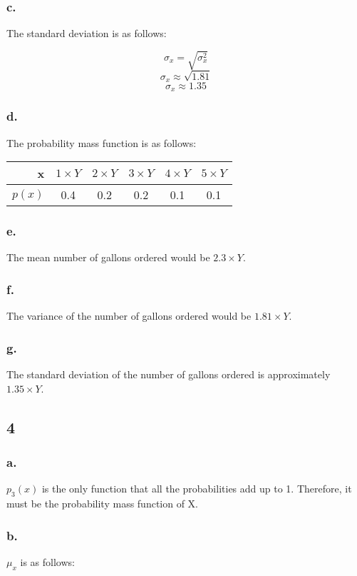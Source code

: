 \documentclass[11pt]{article}
\begin{document}
\subsubsection*{c.}
The standard deviation is as follows:

\[ \sigma_x = \sqrt{\sigma^2_x} \]
\[ \sigma_x \approx \sqrt{1.81} \]
\[ \sigma_x \approx 1.35 \]

\subsubsection*{d.}
The probability mass function is as follows:

\begin{tabular}{r|ccccc} %
    x & $1 \times Y$ & $2 \times Y$ & $3 \times Y$ & $4 \times Y$ & $5 \times Y$ \\
    \hline %
    $p(x)$ & 0.4 & 0.2 & 0.2 & 0.1 & 0.1
\end{tabular}

\subsubsection*{e.}
The mean number of gallons ordered would be $2.3 \times Y$. 

\subsubsection*{f.}
The variance of the number of gallons ordered would be $1.81 \times Y$. 

\subsubsection*{g.}
The standard deviation of the number of gallons ordered is approximately 
$1.35 \times Y$. 

\subsection*{4}
\subsubsection*{a.}
$p_3(x)$ is the only function that all the probabilities add up to 1. Therefore,
it must be the probability mass function of X.

\subsubsection*{b.}
$\mu_x$ is as follows:
\end{document}

